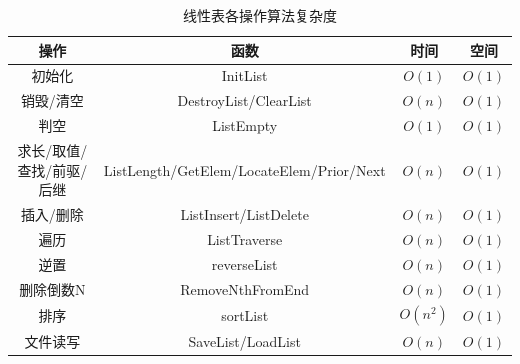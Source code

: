 \documentclass[supercite]{Experimental_Report}
\begin{document}
\begin{table}[H]\centering
\caption{线性表各操作算法复杂度}
\label{tbl:complexity1}\renewcommand\arraystretch{1.2}
\begin{tabular}{|c|c|c|c|}\hline
\textbf{操作} & \textbf{函数} & \textbf{时间} & \textbf{空间} \\\hline
初始化 & InitList & $O(1)$ & $O(1)$ \\\hline
销毁/清空 & DestroyList/ClearList & $O(n)$ & $O(1)$ \\\hline
判空 & ListEmpty & $O(1)$ & $O(1)$ \\\hline
求长/取值/查找/前驱/后继 & ListLength/GetElem/LocateElem/Prior/Next & $O(n)$ & $O(1)$ \\\hline
插入/删除 & ListInsert/ListDelete & $O(n)$ & $O(1)$ \\\hline
遍历 & ListTraverse & $O(n)$ & $O(1)$ \\\hline
逆置 & reverseList & $O(n)$ & $O(1)$ \\\hline
删除倒数N & RemoveNthFromEnd & $O(n)$ & $O(1)$ \\\hline
排序 & sortList & $O(n^2)$ & $O(1)$ \\\hline
文件读写 & SaveList/LoadList & $O(n)$ & $O(1)$ \\\hline
\end{tabular}
\end{table}
\vspace{0.5em}
\end{document}
